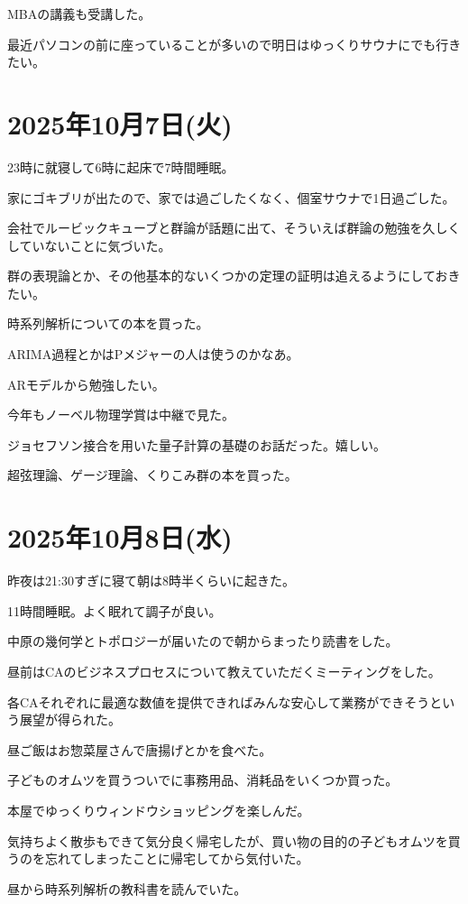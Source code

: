 \documentclass[uplatex]{jsarticle}
\begin{document}
MBAの講義も受講した。

最近パソコンの前に座っていることが多いので明日はゆっくりサウナにでも行きたい。

\section{2025年10月7日(火)}

23時に就寝して6時に起床で7時間睡眠。

家にゴキブリが出たので、家では過ごしたくなく、個室サウナで1日過ごした。

会社でルービックキューブと群論が話題に出て、そういえば群論の勉強を久しくしていないことに気づいた。

群の表現論とか、その他基本的ないくつかの定理の証明は追えるようにしておきたい。

時系列解析についての本を買った。

ARIMA過程とかはPメジャーの人は使うのかなあ。

ARモデルから勉強したい。

今年もノーベル物理学賞は中継で見た。

ジョセフソン接合を用いた量子計算の基礎のお話だった。嬉しい。

超弦理論、ゲージ理論、くりこみ群の本を買った。

\section{2025年10月8日(水)}

昨夜は21:30すぎに寝て朝は8時半くらいに起きた。

11時間睡眠。よく眠れて調子が良い。

中原の幾何学とトポロジーが届いたので朝からまったり読書をした。

昼前はCAのビジネスプロセスについて教えていただくミーティングをした。

各CAそれぞれに最適な数値を提供できればみんな安心して業務ができそうという展望が得られた。

昼ご飯はお惣菜屋さんで唐揚げとかを食べた。

子どものオムツを買うついでに事務用品、消耗品をいくつか買った。

本屋でゆっくりウィンドウショッピングを楽しんだ。

気持ちよく散歩もできて気分良く帰宅したが、買い物の目的の子どもオムツを買うのを忘れてしまったことに帰宅してから気付いた。

昼から時系列解析の教科書を読んでいた。
\end{document}

